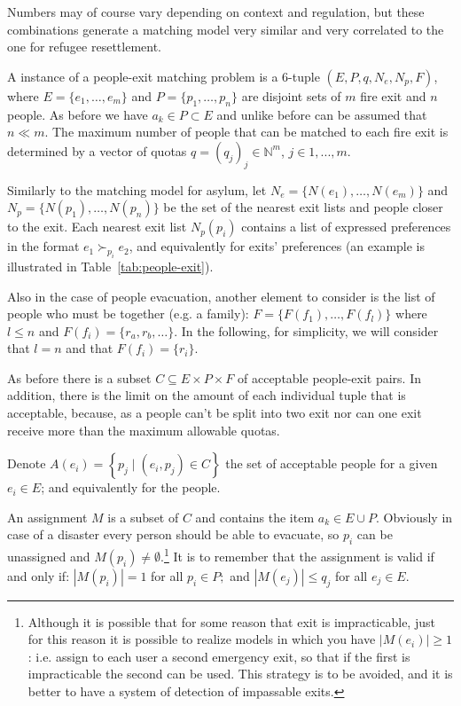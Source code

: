 Numbers may of course vary depending on context and regulation, but these combinations generate a matching model very similar and very correlated to the one for refugee resettlement.

A instance of a people-exit matching problem is a 6-tuple \((E, P, q, N_e, N_p, F)\), where \(E = \{e_1, \dots, e_m\}\) and \(P = \{p_1, \dots, p_n\}\) are disjoint sets of \(m\) fire exit and \(n\) people.
As before we have \(a_k \in P \subset E\) and unlike before can be assumed that \(n \ll m\).
The maximum number of people that can be matched to each fire exit is determined by a vector of quotas \(q = (q_j)_j \in \mathbb{N}^m\), \(j\in {1,...,m}\).

Similarly to the matching model for asylum, let \(N_e = \{N(e_1), \dots, N(e_m)\}\) and \(N_p = \{ N(p_1), \dots, N(p_n)\}\) be the set of the nearest exit lists and people closer to the exit.
Each nearest exit list \(N_p(p_i)\) contains a list of expressed preferences in the format \(e_1 \succ_{p_i} e_2\), and equivalently for exits' preferences (an example is illustrated in Table~\ref{tab:people-exit}).

Also in the case of people evacuation, another element to consider is the list of people who must be together (e.g. a family): \(F=\{F(f_1), \dots, F(f_l)\}\) where \(l\leq n\) and \(F(f_i) = \{r_a, r_b, \dots\}\).
In the following, for simplicity, we will consider that \(l=n\) and that \(F(f_i)=\{r_i\}\).
    
As before there is a subset \(C \subseteq E \times P \times F\) of acceptable people-exit pairs.
In addition, there is the limit on the amount of each individual tuple that is acceptable, because, as a people can't be split into two exit nor can one exit receive more than the maximum allowable quotas.

Denote \( A \left( e_i \right) = \left\{ p_j \mid \left( e_i , p_j \right) \in C \right\} \) the set of acceptable people for a given \( e_i \in E \); and equivalently for the people.

An assignment \(M\) is a subset of \(C\) and contains the item \( a_k \in E \cup P \).
Obviously in case of a disaster every person should be able to evacuate, so  \( p_i\) can be unassigned and \( M \left( p_i\right) \neq \emptyset \).\footnote{Although it is possible that for some reason that exit is impracticable, just for this reason it is possible to realize models in which you have \(|M \left( e_i \right)| \geq 1\): i.e. assign to each user a second emergency exit, so that if the first is impracticable the second can be used.
This strategy is to be avoided, and it is better to have a system of detection of impassable exits.}
It is to remember that the assignment is valid if and only if: \( \left| M \left( p_i\right) \right| = 1 \) for all \( p_i\in P ; \) and \( \left| M \left( e_j \right) \right| \leq q _ { j } \) for all \( e_j \in E  \).

